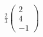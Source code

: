 \documentclass[preview]{standalone}
\begin{document}
\begin{align*}
\frac{2}{3} \begin{pmatrix} 2 \\ 4 \\ -1 \end{pmatrix}
\end{align*}
\end{document}
